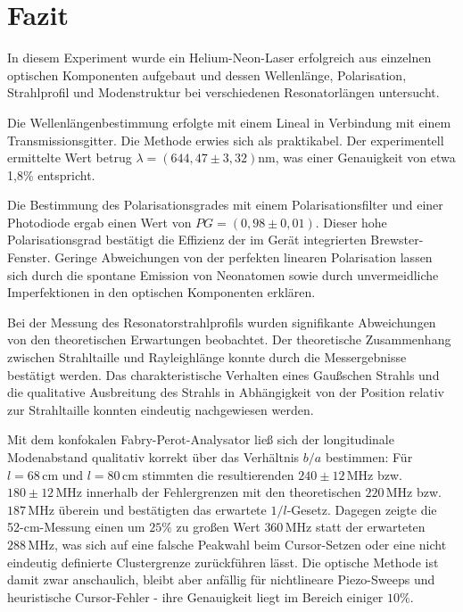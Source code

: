 \chapter{Fazit}
In diesem Experiment wurde ein Helium-Neon-Laser erfolgreich aus einzelnen optischen Komponenten aufgebaut und dessen Wellenlänge, Polarisation, Strahlprofil und Modenstruktur bei verschiedenen Resonatorlängen untersucht.

Die Wellenlängenbestimmung erfolgte mit einem Lineal in Verbindung mit einem Transmissionsgitter. Die Methode erwies sich als praktikabel. Der experimentell ermittelte Wert betrug \(\lambda = (644,47 \pm 3,32)\)nm, was einer Genauigkeit von etwa 1,8\% entspricht.

Die Bestimmung des Polarisationsgrades mit einem Polarisationsfilter und einer Photodiode ergab einen Wert von $PG=(0{,}98 \pm 0{,}01)$. Dieser hohe Polarisationsgrad bestätigt die Effizienz der im Gerät integrierten Brewster-Fenster. Geringe Abweichungen von der perfekten linearen Polarisation lassen sich durch die spontane Emission von Neonatomen sowie durch unvermeidliche Imperfektionen in den optischen Komponenten erklären.

Bei der Messung des Resonatorstrahlprofils wurden signifikante Abweichungen von den theoretischen Erwartungen beobachtet. Der theoretische Zusammenhang zwischen Strahltaille und Rayleighlänge konnte durch die Messergebnisse bestätigt werden. Das charakteristische Verhalten eines Gaußschen Strahls und die qualitative Ausbreitung des Strahls in Abhängigkeit von der Position relativ zur Strahltaille konnten eindeutig nachgewiesen werden.

Mit dem konfokalen Fabry-Perot-Analysator ließ sich der longitudinale Modenabstand qualitativ korrekt über das Verhältnis $b/a$ bestimmen: Für $l = 68\,\mathrm{cm}$ und $l = 80\,\mathrm{cm}$ stimmten die resultierenden $240 \pm 12\,\mathrm{MHz}$ bzw.\ $180 \pm 12\,\mathrm{MHz}$ innerhalb der Fehlergrenzen mit den theoretischen $220\,\mathrm{MHz}$ bzw.\ $187\,\mathrm{MHz}$ überein und bestätigten das erwartete $1/l$-Gesetz. Dagegen zeigte die 52-cm-Messung einen um $25 \%$ zu großen Wert $360\,\mathrm{MHz}$ statt der erwarteten $288\,\mathrm{MHz}$, was sich auf eine falsche Peakwahl beim Cursor-Setzen oder eine nicht eindeutig definierte Clustergrenze zurückführen lässt. Die optische Methode ist damit zwar anschaulich, bleibt aber anfällig für nichtlineare Piezo-Sweeps und heuristische Cursor-Fehler - ihre Genauigkeit liegt im Bereich einiger $10 \%$.

